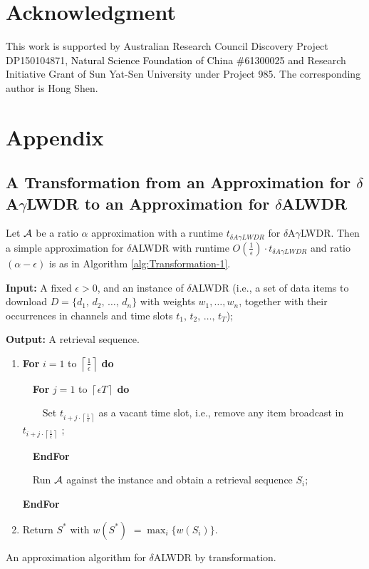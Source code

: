 \documentclass[11pt,english,onecolumn,draftcls]{IEEEtran}
\theoremstyle{plain}
\theoremstyle{plain}
\theoremstyle{plain}
\theoremstyle{plain}
\begin{document}
\section*{Acknowledgment}

This work is supported by Australian Research Council Discovery Project
DP150104871, \textcolor{black}{Natural Science Foundation of China
\#61300025 and} Research Initiative Grant of Sun Yat-Sen University
under Project 985. The corresponding author is Hong Shen.






\section*{Appendix}


\subsection*{A Transformation from an Approximation for $\delta$A$\gamma$LWDR
to an Approximation for $\delta$ALWDR }

Let ${\cal A}$ be a ratio $\alpha$ approximation with a runtime
$t_{\delta A\gamma LWDR}$ for $\delta$A$\gamma$LWDR. Then a simple
approximation for $\delta$ALWDR with runtime $O(\frac{1}{\epsilon})\cdot t_{\delta A\gamma LWDR}$
and ratio $(\alpha-\epsilon)$ is as in Algorithm \ref{alg:Transformation-1}.

\begin{algorithm}
\textbf{Input: }A fixed $\epsilon>0$, and an instance of $\delta$ALWDR
(i.e., a set of data items to download $D=\{d_{1},\, d_{2},\,\dots,\, d_{n}\}$
with weights $w_{1},\dots,w_{n}$, together with their occurrences
in channels and time slots $t_{1},\, t_{2},\,\dots,\, t_{T}$);

\textbf{Output:} A retrieval sequence.
\begin{enumerate}
\item \textbf{For} $i=1$ to $\left\lceil \frac{1}{\epsilon}\right\rceil $
\textbf{do}


\textbf{$\quad$For} $j=1$ to $\left\lceil \epsilon T\right\rceil $
\textbf{do}


\textbf{$\quad$$\quad$}Set $t_{i+j\cdot\left\lceil \frac{1}{\epsilon}\right\rceil }$
as a vacant time slot, i.e., remove any item broadcast in $t_{i+j\cdot\left\lceil \frac{1}{\epsilon}\right\rceil }$
;


\textbf{$\quad$EndFor}


\textbf{$\quad$}Run ${\cal A}$ against the instance and obtain a
retrieval sequence $S_{i}$;


\textbf{EndFor}

\item Return $S^{*}$ with $w(S^{*})$ $=\max_{i}\{w(S_{i})\}$.
\end{enumerate}
\protect\caption{\label{alg:Transformation-1}An approximation algorithm for $\delta$ALWDR
by transformation.}
\end{algorithm}
\end{document}
